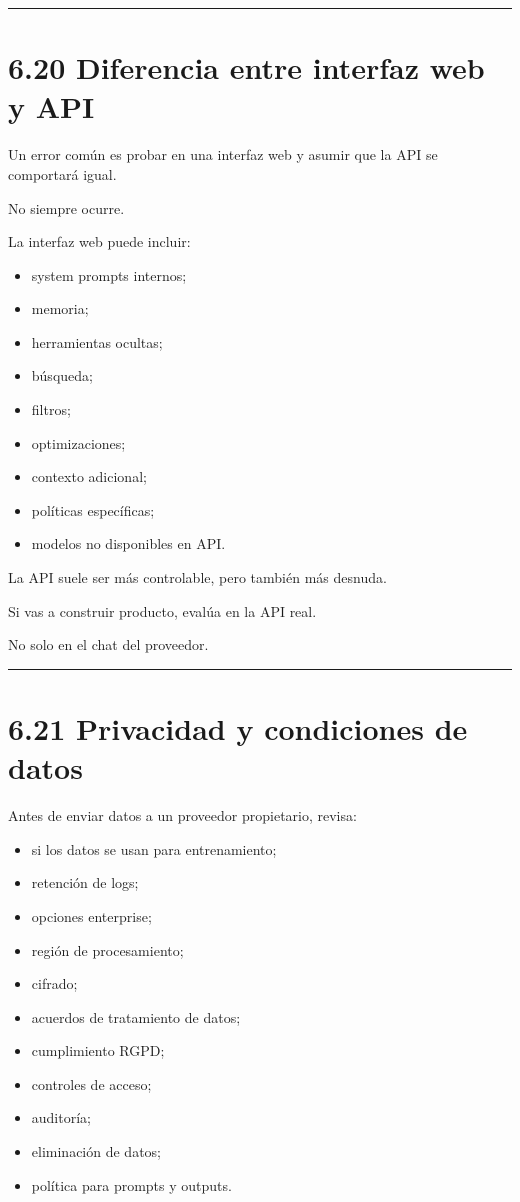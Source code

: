 \begin{center}\rule{0.5\linewidth}{0.5pt}\end{center}

\section{6.20 Diferencia entre interfaz web y
API}\label{diferencia-entre-interfaz-web-y-api}

Un error común es probar en una interfaz web y asumir que la API se
comportará igual.

No siempre ocurre.

La interfaz web puede incluir:

\begin{itemize}
\tightlist
\item
  system prompts internos;
\item
  memoria;
\item
  herramientas ocultas;
\item
  búsqueda;
\item
  filtros;
\item
  optimizaciones;
\item
  contexto adicional;
\item
  políticas específicas;
\item
  modelos no disponibles en API.
\end{itemize}

La API suele ser más controlable, pero también más desnuda.

Si vas a construir producto, evalúa en la API real.

No solo en el chat del proveedor.

\begin{center}\rule{0.5\linewidth}{0.5pt}\end{center}

\section{6.21 Privacidad y condiciones de
datos}\label{privacidad-y-condiciones-de-datos}

Antes de enviar datos a un proveedor propietario, revisa:

\begin{itemize}
\tightlist
\item
  si los datos se usan para entrenamiento;
\item
  retención de logs;
\item
  opciones enterprise;
\item
  región de procesamiento;
\item
  cifrado;
\item
  acuerdos de tratamiento de datos;
\item
  cumplimiento RGPD;
\item
  controles de acceso;
\item
  auditoría;
\item
  eliminación de datos;
\item
  política para prompts y outputs.
\end{itemize}

